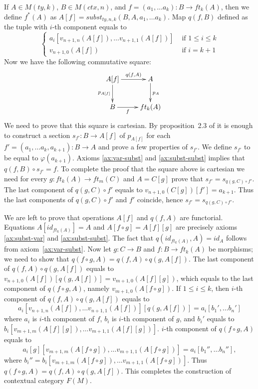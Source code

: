 \documentclass[reqno]{amsart}
\theoremstyle{definition}
\theoremstyle{remark}
\numberwithin{figure}{section}
\begin{document}
If $A \in M(ty,k)$, $B \in M(ctx,n)$, and $f = (a_1, \ldots a_k) : B \to ft_k(A)$, then we define $f^*(A)$ as $A[f] = subst_{ty,n,k}(B, A, a_1, \ldots a_k)$.
Map $q(f,B)$ defined as the tuple with $i$-th component equals to
\[ \left\{
  \begin{array}{lr}
    a_i[v_{n+1,n}(A[f]), \ldots v_{n+1,1}(A[f])] & \text{ if } 1 \leq i \leq k \\
    v_{n+1,0}(A[f])                              & \text{ if } i = k+1
  \end{array}
\right. \]
Now we have the following commutative square:
\[ \xymatrix{ A[f] \ar[r]^-{q(f,A)} \ar[d]_{p_{A[f]}} & A \ar[d]^{p_A} \\
              B \ar[r]_-f                             & ft_k(A)
            } \]
We need to prove that this square is cartesian.
By proposition~2.3 of \cite{c-systems} it is enough to construct a section $s_{f'} : B \to A[f]$ of $p_{A[f]}$
    for each $f' = (a_1, \ldots a_k, a_{k+1}) : B \to A$ and prove a few properties of $s_{f'}$.
We define $s_{f'}$ to be equal to $\varphi(a_{k+1})$.
Axioms \eqref{ax:var-subst} and \eqref{ax:subst-subst} implies that $q(f,B) \circ s_{f'} = f$.
To complete the proof that the square above is cartesian we need for every $g : ft_k(A) \to ft_m(C)$ and $A = C[g]$ prove that $s_{f'} = s_{q(g,C) \circ f'}$.
The last component of $q(g,C) \circ f'$ equals to $v_{n+1,0}(C[g])[f'] = a_{k+1}$.
Thus the last components of $q(g,C) \circ f'$ and $f'$ coincide, hence $s_{f'} = s_{q(g,C) \circ f'}$.

We are left to prove that operations $A[f]$ and $q(f,A)$ are functorial.
Equations $A[id_{ft_k(A)}] = A$ and $A[f \circ g] = A[f][g]$ are precisely axioms \eqref{ax:subst-var} and \eqref{ax:subst-subst}.
The fact that $q(id_{ft_k(A)}, A) = id_A$ follows from axiom~\ref{ax:var-subst}.
Now let $g : C \to B$ and $f : B \to ft_k(A)$ be morphisms; we need to show that $q(f \circ g, A) = q(f,A) \circ q(g,A[f])$.
The last component of $q(f,A) \circ q(g,A[f])$ equals to $v_{n+1,0}(A[f])[q(g,A[f])] = v_{m+1,0}(A[f][g])$,
    which equals to the last component of $q(f \circ g, A)$, namely $v_{m+1,0}(A[f \circ g])$.
If $1 \leq i \leq k$, then $i$-th component of $q(f,A) \circ q(g,A[f])$ equals to
\[ a_i[v_{n+1,n}(A[f]), \ldots v_{n+1,1}(A[f])][q(g,A[f])] = a_i[b_1', \ldots b_n'] \]
where $a_i$ is $i$-th component of $f$, $b_i$ is $i$-th component of $g$, and $b_i'$ equals to $b_i[v_{m+1,m}(A[f][g]), \ldots v_{m+1,1}(A[f][g])]$.
$i$-th component of $q(f \circ g, A)$ equals to
\[ a_i[g][v_{m+1,m}(A[f \circ g]), \ldots v_{m+1,1}(A[f \circ g])] = a_i[b_1'', \ldots b_n''], \]
where $b_i'' = b_i[v_{m+1,m}(A[f \circ g]), \ldots v_{m+1,1}(A[f \circ g])]$.
Thus $q(f \circ g, A) = q(f,A) \circ q(g,A[f])$.
This completes the construction of contextual category $F(M)$.
\end{document}

